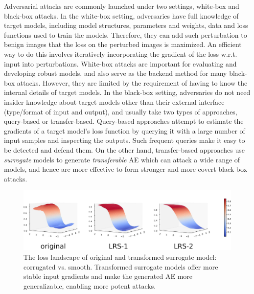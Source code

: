 \documentclass[letterpaper]{article} %
\theoremstyle{plain}
\theoremstyle{definition}
\begin{document}
Adversarial attacks are commonly launched under two settings, white-box and black-box attacks. In the white-box setting, adversaries have full knowledge of target models, including model structures, parameters and weights, data and loss functions used to train the models. Therefore, they can add such perturbation to benign images that the loss on the perturbed images is maximized. An efficient way to do this involves iteratively incorporating the gradient of the loss w.r.t. input \cite{goodfellow2015FGSM,madry2018pgd} into perturbations. White-box attacks are important for evaluating and developing robust models, and also serve as the backend method for many black-box attacks. However, they are limited by the requirement of having to know the internal details of target models. In the black-box setting, adversaries do not need insider knowledge about target models other than their external interface (type/format of input and output), and usually take two types of approaches, query-based or transfer-based. Query-based approaches attempt to estimate the gradients of a target model's loss function by querying it with a large number of input samples and inspecting the outputs. Such frequent queries make it easy to be detected and defend them. On the other hand, transfer-based approaches use {\em surrogate} models to generate {\em transferable} AE which can attack a wide range of models, and hence are more effective to form stronger and more covert black-box attacks.

\begin{figure}[t]
    \centering
    \includegraphics[width=\linewidth]{figs/loss_landscape.pdf}
    \caption{The loss landscape of original and transformed surrogate model: corrugated vs. smooth. Transformed surrogate models offer more stable input gradients and make the generated AE more generalizable, enabling more potent attacks.}
    \label{fig:loss_landscape}
\end{figure}
\end{document}
